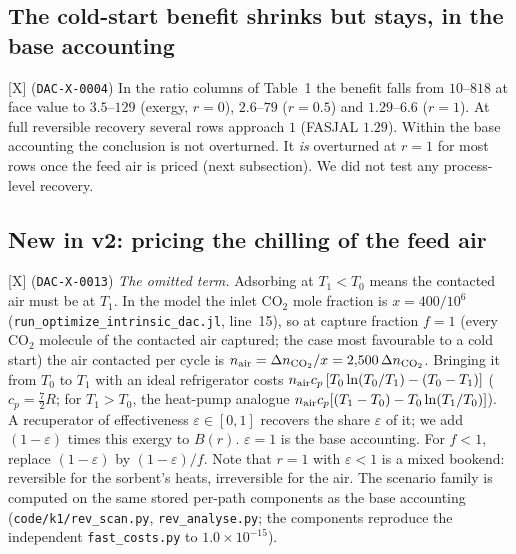 \documentclass[10pt]{article}
\newcommand{\tier}[1]{\textsf{[#1]}}
\newcommand{\tX}{\tier{X}}
\newcommand{\id}[1]{\texttt{DAC-#1}}
\begin{document}
\subsection{The cold-start benefit shrinks but stays, in the base accounting}
\tX{} (\id{X-0004}) In the ratio columns of Table~1 the benefit falls from $10$--$818$ at face value to $3.5$--$129$ (exergy, $r=0$), $2.6$--$79$ ($r=0.5$) and $1.29$--$6.6$ ($r=1$). At full reversible recovery several rows approach $1$ (FASJAL $1.29$). Within the base accounting the conclusion is not overturned. It \emph{is} overturned at $r=1$ for most rows once the feed air is priced (next subsection). We did not test any process-level recovery.

\subsection{New in v2: pricing the chilling of the feed air}\label{sec:air}
\tX{} (\id{X-0013}) \emph{The omitted term.} Adsorbing at $T_1<T_0$ means the contacted air must be at $T_1$. In the model the inlet CO$_2$ mole fraction is $x=400/10^6$ (\texttt{run\_optimize\_intrinsic\_dac.jl}, line~15), so at capture fraction $f=1$ (every CO$_2$ molecule of the contacted air captured; the case most favourable to a cold start) the air contacted per cycle is $n_{\rm air}=\Delta n_{\rm CO_2}/x=2{,}500\,\Delta n_{\rm CO_2}$. Bringing it from $T_0$ to $T_1$ with an ideal refrigerator costs $n_{\rm air}c_p\,[T_0\ln(T_0/T_1)-(T_0-T_1)]$ ($c_p=\tfrac72R$; for $T_1>T_0$, the heat-pump analogue $n_{\rm air}c_p[(T_1-T_0)-T_0\ln(T_1/T_0)]$). A recuperator of effectiveness $\varepsilon\in[0,1]$ recovers the share $\varepsilon$ of it; we add $(1-\varepsilon)$ times this exergy to $B(r)$. $\varepsilon=1$ is the base accounting. For $f<1$, replace $(1-\varepsilon)$ by $(1-\varepsilon)/f$. Note that $r=1$ with $\varepsilon<1$ is a mixed bookend: reversible for the sorbent's heats, irreversible for the air. The scenario family is computed on the same stored per-path components as the base accounting (\texttt{code/k1/rev\_scan.py}, \texttt{rev\_analyse.py}; the components reproduce the independent \texttt{fast\_costs.py} to $1.0\times10^{-15}$).
\end{document}
